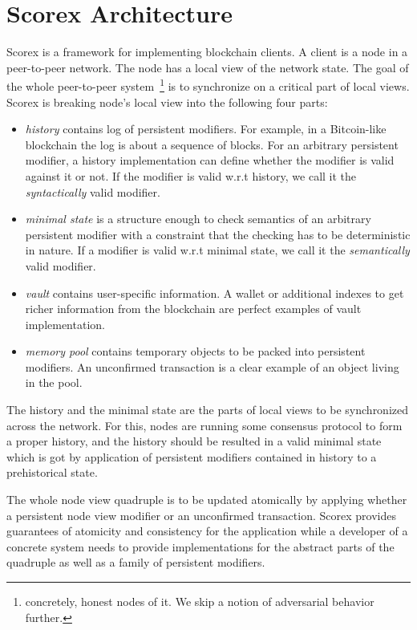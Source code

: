
\section{Scorex Architecture}

Scorex is a framework for implementing blockchain clients. A client is a node in a peer-to-peer network. The node has a local view of the network state. The goal of the whole peer-to-peer system~\footnote{concretely, honest nodes of it. We skip a notion of adversarial behavior further.} is to synchronize on a critical part of local views. Scorex is breaking node's local view into the following four parts: 

\begin{itemize}
\item{\em history} contains log of persistent modifiers. For example, in a Bitcoin-like blockchain the log is about a sequence of blocks. For an arbitrary persistent modifier, a history implementation can define whether the modifier is valid against it or not.
If the modifier is valid w.r.t history, we call it the {\em syntactically} valid modifier.   
\item{\em minimal state} is a structure enough to check semantics of an arbitrary persistent modifier with a constraint that the checking has to be deterministic in nature. If a modifier is valid w.r.t minimal state, we call it the {\em semantically} valid modifier.
\item{\em vault} contains user-specific information. A wallet or additional indexes to get richer information from the blockchain are perfect examples of vault implementation. 
\item{\em memory pool} contains temporary objects to be packed into persistent modifiers. An unconfirmed transaction is a clear example of an object living in the pool.
\end{itemize}

The history and the minimal state are the parts of local views to be synchronized across the network. For this, nodes are running some consensus protocol to form a proper history, and the history should be resulted in a valid minimal state which is got by application of persistent modifiers contained in history to a prehistorical state.

The whole node view quadruple is to be updated atomically by applying whether a persistent node view modifier or an unconfirmed transaction. Scorex provides guarantees of atomicity and consistency for the application while a developer of a concrete system needs to provide implementations for the abstract parts of the quadruple as well as a family of persistent modifiers.

